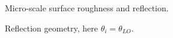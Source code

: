 \begin{figure}[t]
\centering
{}
\caption{Micro-scale surface roughness and reflection.\label{nonlambert}}
\end{figure}

\begin{figure}[bt]
\centerline{}
\caption{Reflection geometry, here $\theta_i=\theta_{LO}$.\label{fig:specref}}
\end{figure}

\FloatBarrier




